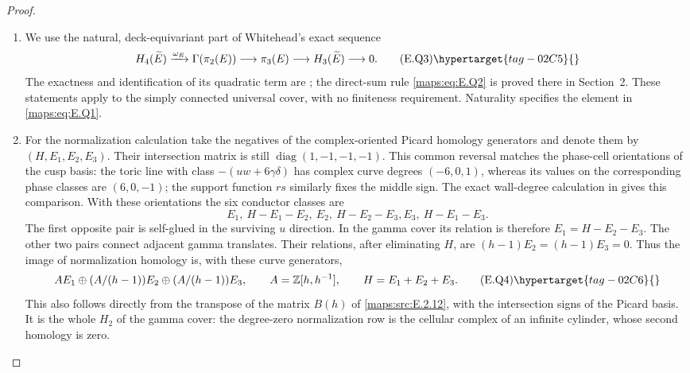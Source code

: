 \begin{proof}
\begin{enumerate}[label={$\langle1\rangle$\arabic*.},leftmargin=*]
\item We use the natural, deck-equivariant part of Whitehead's exact
sequence
\[
 H_4(\widetilde E)\xrightarrow{\omega_E}\Gamma(\pi_2(E))
       \longrightarrow\pi_3(E)\longrightarrow
 H_3(\widetilde E)\longrightarrow0.
 \tag{E.Q3}\hypertarget{tag-02C5}{}\label{maps:eq:E.Q3}
\]
The exactness and identification of its quadratic term are
\cite[Theorems 1 and 5]{mapsWhitehead50}; the direct-sum rule
\eqref{maps:eq:E.Q2} is proved there in Section~2.  These statements apply
to the simply connected universal cover, with no finiteness
requirement.  Naturality specifies the element in \eqref{maps:eq:E.Q1}.

\item For the normalization calculation take the negatives of
the complex-oriented Picard homology generators and denote
them by $(H,E_1,E_2,E_3)$.  Their intersection matrix is
still $\operatorname{diag}(1,-1,-1,-1)$.  This common reversal matches the phase-cell orientations of the cusp basis: the toric
line with class $-(uw+6\gamma\delta)$ has complex curve
degrees $(-6,0,1)$, whereas its values on the corresponding
phase classes are $(6,0,-1)$; the support function $rs$
similarly fixes the middle sign.  The exact wall-degree
calculation in  gives this comparison.  With these
orientations the six conductor classes are
\[
 E_1,\ H-E_1-E_2,\ E_2,\ H-E_2-E_3,
                                      E_3,\ H-E_1-E_3.
\]
The first opposite pair is self-glued in the surviving $u$
direction.  In the gamma cover its relation is therefore
$E_1=H-E_2-E_3$.  The other two pairs connect adjacent gamma
translates.  Their relations, after eliminating $H$, are
$(h-1)E_2=(h-1)E_3=0$.  Thus the image of normalization
homology is, with these curve generators,
\[
 A E_1\oplus(A/(h-1))E_2\oplus(A/(h-1))E_3,
 \qquad A=\mathbb Z[h,h^{-1}],\qquad H=E_1+E_2+E_3.
 \tag{E.Q4}\hypertarget{tag-02C6}{}\label{maps:eq:E.Q4}
\]
This also follows directly from the transpose of the matrix
$B(h)$ of \ref{maps:src:E.2.12}, with the intersection signs of the Picard basis.  It is the whole $H_2$ of the gamma cover:
the degree-zero normalization row is the cellular complex
of an infinite cylinder, whose second homology is zero.


\end{enumerate}
\end{proof}
